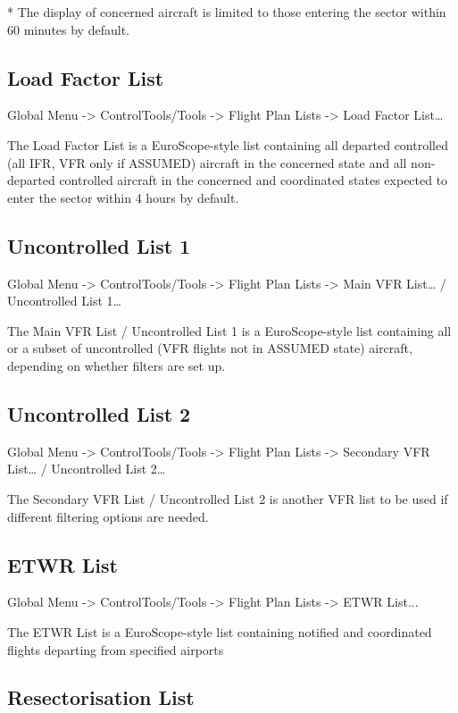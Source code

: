 \documentclass[11pt,a4paper]{memoir}
\begin{document}
* The display of concerned aircraft is limited to those entering the sector within 60 minutes by default.

\subsection{Load Factor List}
\label{list:load}

Global Menu -> ControlTools/Tools -> Flight Plan Lists -> Load Factor List…

The Load Factor List is a EuroScope-style list containing all departed controlled (all IFR, VFR only if ASSUMED) aircraft in the concerned state and all non-departed controlled aircraft in the concerned and coordinated states expected to enter the sector within 4 hours by default.

\subsection{Uncontrolled List 1}
\label{list:uncon1}

Global Menu -> ControlTools/Tools -> Flight Plan Lists -> Main VFR List… / Uncontrolled List 1…

The Main VFR List / Uncontrolled List 1 is a EuroScope-style list containing all or a subset of uncontrolled (VFR flights not in ASSUMED state) aircraft, depending on whether filters are set up.

\subsection{Uncontrolled List 2}
\label{list:uncon2}

Global Menu -> ControlTools/Tools -> Flight Plan Lists -> Secondary VFR List… / Uncontrolled List 2…

The Secondary VFR List / Uncontrolled List 2 is another VFR list to be used if different filtering options are needed.

\subsection{ETWR List}
\label{list:etwr}

Global Menu -> ControlTools/Tools -> Flight Plan Lists -> ETWR List...

The ETWR List is a EuroScope-style list containing notified and coordinated flights departing from specified airports

\subsection{Resectorisation List}
\label{list:resec}
\end{document}
